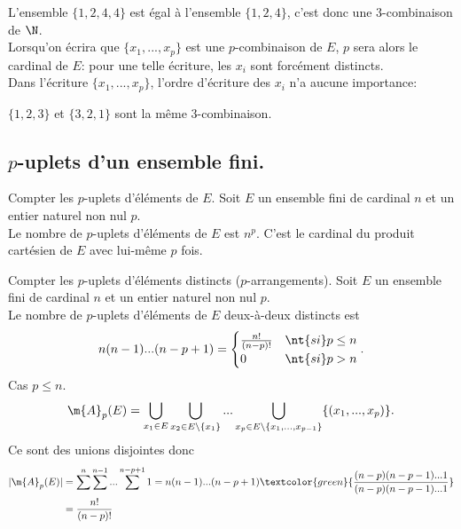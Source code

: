 \documentclass[11pt]{article}
\begin{document}
L'ensemble $\{1,2,4,4\}$ est égal à l'ensemble $\{1,2,4\}$, c'est donc une $3$-combinaison de $\N$.\\
Lorsqu'on écrira que $\{x_1,...,x_p\}$ est une $p$-combinaison de $E$, $p$ sera alors le cardinal de $E$: pour une telle écriture, les $x_i$ sont forcément distincts.\\
Dans l'écriture $\{x_1,...,x_p\}$, l'ordre d'écriture des $x_i$ n'a aucune importance:
\begin{center}
    $\{1,2,3\}$ et $\{3,2,1\}$ sont la même 3-combinaison.
\end{center}

\subsection{\texorpdfstring{$p$}{Lg}-uplets d'un ensemble fini.}

\begin{prop}{Compter les $p$-uplets d'éléments de $E$.}{}
    Soit $E$ un ensemble fini de cardinal $n$ et un entier naturel non nul $p$.\\
    Le nombre de $p$-uplets d'éléments de $E$ est $n^p$.
    \tcblower
    C'est le cardinal du produit cartésien de $E$ avec lui-même $p$ fois.
\end{prop}

\pagebreak

\begin{prop}{Compter les $p$-uplets d'éléments distincts ($p$-arrangements).}{}
    Soit $E$ un ensemble fini de cardinal $n$ et un entier naturel non nul $p$.\\
    Le nombre de $p$-uplets d'éléments de $E$ deux-à-deux distincts est
    \begin{equation*}
        n(n-1)...(n-p+1)=\begin{cases}
            \frac{n!}{(n-p)!}&\nt{si }p\leq n\\
            0&\nt{si }p>n
        \end{cases}.
    \end{equation*}
    \tcblower
    Cas $p\leq n$.
    \begin{equation*}
        \m{A}_p(E)=\bigcup_{x_1\in E}\bigcup_{x_2\in E\setminus\{x_1\}}...\bigcup_{x_p\in E\setminus\{x_1,...,x_{p-1}\}}\{(x_1,...,x_p)\}.
    \end{equation*}
    Ce sont des unions disjointes donc
    \begin{align*}
        |\m{A}_p(E)|&=\sum^n\sum^{n-1}...\sum^{n-p+1}1=n(n-1)...(n-p+1)\textcolor{green}{\frac{(n-p)(n-p-1)...1}{(n-p)(n-p-1)...1}}\\
        &=\frac{n!}{(n-p)!}
    \end{align*}
\end{prop}
\end{document}
